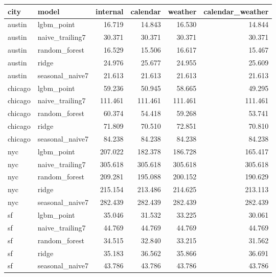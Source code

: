 \begin{tabular}{llrrrr}
\toprule
city & model & internal & calendar & weather & calendar\_weather \\
\midrule
austin & lgbm\_point & 16.719 & 14.843 & 16.530 & 14.844 \\
austin & naive\_trailing7 & 30.371 & 30.371 & 30.371 & 30.371 \\
austin & random\_forest & 16.529 & 15.506 & 16.617 & 15.467 \\
austin & ridge & 24.976 & 25.677 & 24.955 & 25.609 \\
austin & seasonal\_naive7 & 21.613 & 21.613 & 21.613 & 21.613 \\
chicago & lgbm\_point & 59.236 & 50.945 & 58.665 & 49.295 \\
chicago & naive\_trailing7 & 111.461 & 111.461 & 111.461 & 111.461 \\
chicago & random\_forest & 60.374 & 54.418 & 59.268 & 53.741 \\
chicago & ridge & 71.809 & 70.510 & 72.851 & 70.810 \\
chicago & seasonal\_naive7 & 84.238 & 84.238 & 84.238 & 84.238 \\
nyc & lgbm\_point & 207.022 & 182.378 & 186.728 & 165.417 \\
nyc & naive\_trailing7 & 305.618 & 305.618 & 305.618 & 305.618 \\
nyc & random\_forest & 209.281 & 195.088 & 200.152 & 190.629 \\
nyc & ridge & 215.154 & 213.486 & 214.625 & 213.113 \\
nyc & seasonal\_naive7 & 282.439 & 282.439 & 282.439 & 282.439 \\
sf & lgbm\_point & 35.046 & 31.532 & 33.225 & 30.061 \\
sf & naive\_trailing7 & 44.769 & 44.769 & 44.769 & 44.769 \\
sf & random\_forest & 34.515 & 32.840 & 33.215 & 31.562 \\
sf & ridge & 35.183 & 36.562 & 35.866 & 36.691 \\
sf & seasonal\_naive7 & 43.786 & 43.786 & 43.786 & 43.786 \\
\bottomrule
\end{tabular}
